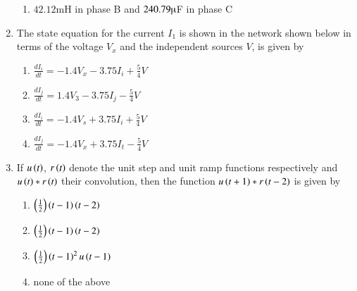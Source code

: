 \documentclass[journal]{IEEEtran}
\begin{document}
\begin{enumerate}
\begin{enumerate}
      \item $42.12$mH in phase B and $240.79\micro$F in phase C
\end{enumerate}
\item The state equation for the current $I_1$ is shown in the network 
shown below in terms of the voltage $V_x$ and the independent sources $V$, is given by 
\begin{figure}[!ht]
\centering
{}%
\end{figure}
\begin{enumerate}
  \item $\frac{dI_i}{dt}=-1.4V_x - 3.75I_i + \frac{5}{4}V$
    \item $\frac{dI_j}{dt}=1.4V_3 - 3.75I_j - \frac{5}{4}V$
    \item $\frac{dI_i}{dt}=-1.4V_s + 3.75I_i + \frac{5}{4}V$
    \item $\frac{dI_j}{dt}=-1.4V_x + 3.75I_t - \frac{5}{4}V$
\end{enumerate}
\item If $u\left(t\right)$, $r\left(t\right)$ denote the unit step and unit ramp functions respectively and $u\left(t\right)*r\left(t\right)$ their convolution, then the function $u\left(t+1\right)*r\left(t-2\right)$ is given by 
\begin{multicols}{2}
\begin{enumerate}
  \item $\left(\frac{1}{2}\right)\left(t-1\right)\left(t-2\right)$
    \item $\left(\frac{1}{2}\right)\left(t-1\right)\left(t-2\right)$
    \item $\left(\frac{1}{2}\right)\left(t-1\right)^2 u\left(t-1\right)$
    \item none of the above
\end{enumerate}    
\end{multicols}
\end{enumerate}
\end{document}
